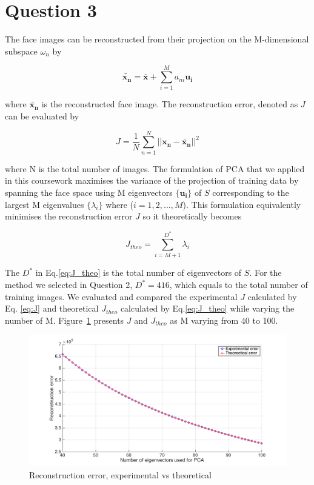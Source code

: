 \documentclass[10pt,twocolumn,letterpaper]{article}
\begin{document}
\section{Question 3}
The face images can be reconstructed from their projection on the M-dimensional subspace $\omega_n$ by

\begin{equation}
	\boldsymbol{\widetilde{x_n}} = \boldsymbol{\bar{x}} + \sum_{i=1}^M a_{ni} \boldsymbol{u_i}
	\label{eq:recon}
\end{equation}

where $\boldsymbol{\widetilde{x_n}}$ is the reconstructed face image. The reconstruction error, denoted as $J$ can be evaluated by

\begin{equation}
 J = \frac{1}{N} \sum_{n=1}^N || \boldsymbol{x_n} - \boldsymbol{\widetilde{x_n}}||^2
 \label{eq:J}
\end{equation}

where N is the total number of images. The formulation of PCA that we applied in this coursework maximises the variance of the projection of training data by spanning the face space using M eigenvectors $\{ \boldsymbol{u_i} \}$ of $S$ corresponding to the largest M eigenvalues $\{ \lambda_i \}$ where ($i = 1,2,...,M$). This formulation equivalently minimises the reconstruction error $J$ so it theoretically becomes

\begin{equation}
J_{theo} = \sum_{i=M+1}^{D^*} \lambda_i
\label{eq:J_theo}
\end{equation}

The $D^*$ in Eq.\ref{eq:J_theo} is the total number of eigenvectors of $S$. For the method we selected in Question 2, $D^* = 416$, which equals to the total number of training images. We evaluated and compared the experimental $J$ calculated by Eq. \ref{eq:J} and theoretical $J_{theo}$ calculated by Eq.\ref{eq:J_theo} while varying the number of M. Figure~\ref{fig:q3_J} presents $J$ and $J_{theo}$ as M varying from 40 to 100.\\
	
	\begin{figure}
		\begin{center}
			\includegraphics[width=1\linewidth]{q3_J}
			\caption{Reconstruction error, experimental vs theoretical}
			\label{fig:q3_J}
		\end{center}
	\end{figure}
\end{document}
